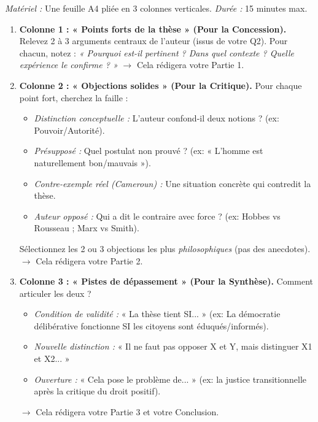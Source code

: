 \documentclass[11pt]{article}
\begin{document}
\begin{methode}
\emph{Matériel :} Une feuille A4 pliée en 3 colonnes verticales. \emph{Durée :} 15 minutes max.
\begin{enumerate}
    \item \textbf{Colonne 1 : « Points forts de la thèse » (Pour la Concession).}
    Relevez 2 à 3 arguments centraux de l'auteur (issus de votre Q2). Pour chacun, notez : \textit{« Pourquoi est-il pertinent ? Dans quel contexte ? Quelle expérience le confirme ? »} $\rightarrow$ Cela rédigera votre Partie 1.
    \item \textbf{Colonne 2 : « Objections solides » (Pour la Critique).}
    Pour chaque point fort, cherchez la faille :
    \begin{itemize}
        \item \textit{Distinction conceptuelle :} L'auteur confond-il deux notions ? (ex: Pouvoir/Autorité).
        \item \textit{Présupposé :} Quel postulat non prouvé ? (ex: « L'homme est naturellement bon/mauvais »).
        \item \textit{Contre-exemple réel (Cameroun) :} Une situation concrète qui contredit la thèse.
        \item \textit{Auteur opposé :} Qui a dit le contraire avec force ? (ex: Hobbes vs Rousseau ; Marx vs Smith).
    \end{itemize}
    Sélectionnez les 2 ou 3 objections les plus \emph{philosophiques} (pas des anecdotes). $\rightarrow$ Cela rédigera votre Partie 2.
    \item \textbf{Colonne 3 : « Pistes de dépassement » (Pour la Synthèse).}
    Comment articuler les deux ? 
    \begin{itemize}
        \item \textit{Condition de validité :} « La thèse tient SI... » (ex: La démocratie délibérative fonctionne SI les citoyens sont éduqués/informés).
        \item \textit{Nouvelle distinction :} « Il ne faut pas opposer X et Y, mais distinguer X1 et X2... »
        \item \textit{Ouverture :} « Cela pose le problème de... » (ex: la justice transitionnelle après la critique du droit positif).
    \end{itemize}
    $\rightarrow$ Cela rédigera votre Partie 3 et votre Conclusion.
\end{enumerate}
\end{methode}
\end{document}
